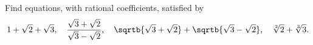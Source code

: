 Find equations, with rational coefficients, satisfied by
\[
1 + \sqrt{2} + \sqrt{3},\quad
\frac{\sqrt{3} + \sqrt{2}}
     {\sqrt{3} - \sqrt{2}},\quad
\sqrtb{\sqrt{3}+ \sqrt{2}} + \sqrtb{\sqrt{3} - \sqrt{2}},\quad
\sqrt[3]{2} + \sqrt[3]{3}.
\]
